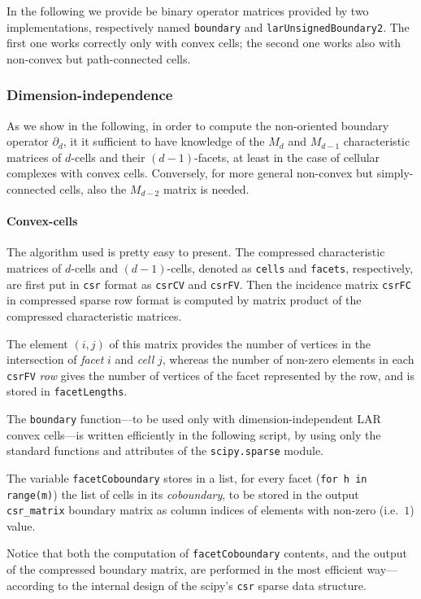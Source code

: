 \documentclass[11pt,oneside]{article}    %
\begin{document}
In the following we provide be binary operator matrices provided by two implementations,
respectively named \texttt{boundary} and \texttt{larUnsignedBoundary2}. The first one works correctly only with convex cells; the second one works also with non-convex but path-connected cells.


\subsubsection{Dimension-independence}

As we show in the following, in order to compute the non-oriented boundary operator $\partial_d$, it it sufficient to have knowledge of the $M_d$ and $M_{d-1}$ characteristic matrices of $d$-cells and their $(d-1)$-facets, at least in the case of cellular complexes with convex cells. Conversely, for more general non-convex but simply-connected cells, also the $M_{d-2}$ matrix is needed.

\paragraph{Convex-cells}

The algorithm used is pretty easy to present. The compressed characteristic matrices of $d$-cells and $(d-1)$-cells, denoted as \texttt{cells} and \texttt{facets}, respectively, are first put in \texttt{csr} format as \texttt{csrCV} and \texttt{csrFV}. Then the incidence matrix \texttt{csrFC} in compressed sparse row format is computed by matrix product of the compressed characteristic matrices. 

The element $(i,j)$ of this matrix provides the number of vertices in the intersection of \emph{facet} $i$ and \emph{cell} $j$, whereas the number of non-zero elements in each \texttt{csrFV} \emph{row} gives the number of vertices of the facet represented by the row, and is stored in \texttt{facetLengths}. 

The \texttt{boundary} function---to be used only with dimension-independent LAR convex cells---is written efficiently in the following script, by using only the standard functions and attributes of the \texttt{scipy.sparse} module.

The variable \texttt{facetCoboundary} stores in a list, for every facet (\texttt{for h in range(m)})
the list of cells in its \emph{coboundary}, to be stored in the output \texttt{csr\_matrix} boundary matrix as column indices of elements with non-zero (i.e.~$1$) value.

Notice that both the computation of \texttt{facetCoboundary} contents, and the output of the compressed boundary matrix, are performed in the most efficient way---according to the internal design of the scipy's \texttt{csr} sparse data structure.
\end{document}
